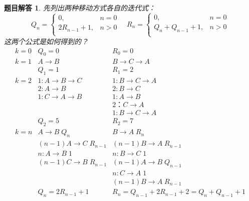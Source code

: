 \documentclass[mode=geye]{elegantnote}
\newtheorem{answer}{题目解答}
\begin{document}
\begin{answer}
	先列出两种移动方式各自的迭代式：
	\begin{equation*}
		Q_{n} = \left\{
		\begin{array}{ll}
			0 ,& n = 0 \\
			2R_{n-1}+1 ,& n>0\\
		\end{array}
		\right. \quad
		R_{n} = \left\{
		\begin{array}{ll}
			0 ,& n = 0 \\
			Q_{n}+Q_{n-1}+1 ,& n>0\\
		\end{array}
		\right.
	\end{equation*}
	这两个公式是如何得到的？
	\begin{equation*}
		\begin{array}{lll}
			k=0 & Q_{0} = 0		 					& R_{0} = 0 \\
			k=1 & A \rightarrow B	 				& B \rightarrow C \rightarrow A \\
				& Q_1=1 							& R_1 = 2\\
			k=2 & 1: A \rightarrow B \rightarrow C 	& 1: B \rightarrow C \rightarrow A \\
				& 2: A \rightarrow B 				& 2: B \rightarrow C \\
				& 1: C \rightarrow A \rightarrow B  & 1: A \rightarrow B \\
				& 									& 2：C \rightarrow A \\
				&									& 1: B \rightarrow C \rightarrow A \\
				& Q_{2} = 5							& R_{2} = 7 \\
			k=n & A \rightarrow B	\; Q_n			& B \rightarrow A\; R_n\\
				& (n-1) A \rightarrow C	\;R_{n-1}	& (n-1) B \rightarrow A \; R_{n-1} \\
				& n: A \rightarrow B	\;1			& n: B \rightarrow C 	\; 1 \\
				& (n-1) C \rightarrow B \;R_{n-1}	& (n-1) A \rightarrow B \; Q_{n-1} \\
				& 									& n: C \rightarrow A 	\; 1 \\
				& 									& (n-1) B \rightarrow A \; R_{n-1} \\
				& Q_n = 2R_{n-1}+1					& R_{n} = Q_{n-1}+2R_{n-1}+2 = Q_{n}+Q_{n-1}+1\\
		\end{array}
	\end{equation*}
\end{answer}
\end{document}
